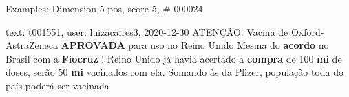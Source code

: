 \begin{frame}{Examples: Dimension 5 pos, score 5, \# 000024}
\footnotesize
\begin{exampleblock}{text: t001551, user: luizacaires3, 2020-12-30}
 ATENÇÃO: Vacina de Oxford-AstraZeneca \textbf{APROVADA} para 
uso no Reino Unido  Mesma do \textbf{acordo} no 
Brasil com a \textbf{Fiocruz} !  Reino Unido já havia 
acertado a \textbf{compra} de 100 \textbf{mi} de doses, serão 50 \textbf{mi} 
vacinados com ela. Somando às da Pfizer, população toda do país poderá ser 
vacinada  
\end{exampleblock}
\end{frame}
